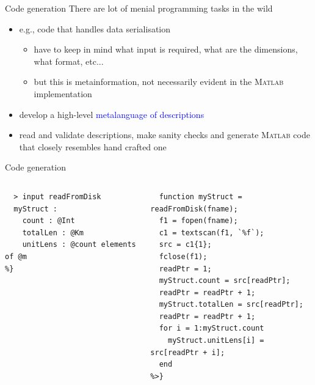 \documentclass[]{beamer}
\newcommand{\keyword}[1]{\textcolor{blue}{#1}}
\newcommand{\ma}{\textsc{Matlab}}
\begin{document}
\begin{frame}{Code generation}
There are lot of menial programming tasks in the wild\pause
\begin{itemize}[<+->]
  \item e.g., code that handles data serialisation
  \begin{itemize}
    \item have to keep in mind what input is required, what are the dimensions, what format, etc...
    \item but this is metainformation, not necessarily evident in the \ma{} implementation
  \end{itemize}
\end{itemize}
\pause
\begin{itemize}[<+->]
  \item develop a high-level \keyword{metalanguage of descriptions}
  \item read and validate descriptions, make sanity checks and generate \ma{} code that closely resembles hand crafted one
\end{itemize}
\end{frame}

\begin{frame}[fragile]{Code generation}
 \begin{columns}
   \begin{column}{0.45\textwidth}
    \begin{lstlisting}[basicstyle=\small]
%{
  > input readFromDisk
  myStruct :
    count : @Int
    totalLen : @Km
    unitLens : @count elements of @m
%}
    \end{lstlisting}
   \end{column}
   \begin{column}{0.45\textwidth}
   \begin{lstlisting}[basicstyle=\tiny]
%<{
  function myStruct = readFromDisk(fname);
  f1 = fopen(fname);
  c1 = textscan(f1, `%f`);
  src = c1{1};
  fclose(f1);
  readPtr = 1;
  myStruct.count = src[readPtr];
  readPtr = readPtr + 1;
  myStruct.totalLen = src[readPtr];
  readPtr = readPtr + 1;
  for i = 1:myStruct.count
    myStruct.unitLens[i] = src[readPtr + i];
  end
%>}
   \end{lstlisting}
   \end{column}
 \end{columns}
\end{frame}
\end{document}
